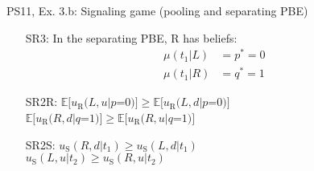 \begin{frame}{PS11, Ex. 3.b: Signaling game (pooling and separating PBE)}
\begin{multicols}{2}
\begin{itemize}
        \item[SR3:] In the separating PBE, R has beliefs:\vspace{-10pt}
        \begin{align*}
          \mu(t_1|L)&=p^*=0&\\
          \mu(t_1|R)&=q^*=1
        \end{align*}
        \item[SR2R:] \vspace{-6pt}
                     $\mathbb{E}[u_\text{R}(L,u|p$=$0)]\geq\mathbb{E}[u_\text{R}(L,d|p$=$0)]$\\
                     $\mathbb{E}[u_\text{R}(R,d|q$=$1)]\geq \mathbb{E}[u_\text{R}(R,u|q$=$1)]$
        \item[SR2S:] $u_\text{S}(R,d|t_1)\geq u_\text{S}(L,d|t_1)$\\
                     $u_\text{S}(L,u|t_2)\geq u_\text{S}(R,u|t_2)$
      \end{itemize}
      \vfill\null \columnbreak
      \vfill
    \end{multicols}
\end{frame}
